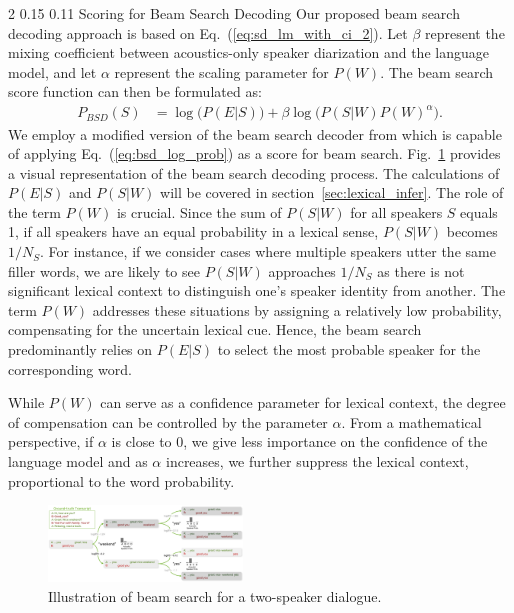 \documentclass{article}
\makeatletter
\renewcommand{\subsection}{\@startsection
  {subsection}%
  {2}%
  {}%
  {0.15\baselineskip}%
  {0.11\baselineskip}%
  {}}%
\makeatother
\begin{document}
\subsection{Scoring for Beam Search Decoding}
Our proposed beam search decoding approach is based on Eq.~(\ref{eq:sd_lm_with_ci_2}). Let $\beta$ represent the mixing coefficient between acoustics-only speaker diarization and the language model, and let $\alpha$ represent the scaling parameter for $P(W)$. The beam search score function can then be formulated as:
\begin{align}
P_{BSD}(S) &= \log \bigl( P(E|S)\bigr) + \beta \log \bigl(P(S|W)P(W)^\alpha \bigr). 
\label{eq:bsd_log_prob}
\end{align}
We employ a modified version of the beam search decoder from \cite{pyctcdecode} which is capable of applying Eq.~(\ref{eq:bsd_log_prob}) as a score for beam search.  Fig.~\ref{fig:bsd_example} provides a visual representation of the beam search decoding process. The calculations of $P(E|S)$ and $P(S|W)$ will be covered in section~\ref{sec:lexical_infer}. The role of the term $P(W)$ is crucial. Since the sum of $P(S|W)$ for all speakers $S$ equals 1, if all speakers have an equal probability in a lexical sense, $P(S|W)$ becomes $1/N_{S}$. For instance, if we consider cases where multiple speakers utter the same filler words, we are likely to see $P(S|W)$ approaches $1/N_{S}$ as there is not significant lexical context to distinguish one's speaker identity from another. The term $P(W)$ addresses these situations by assigning a relatively low probability, compensating for the uncertain lexical cue. Hence, the beam search predominantly relies on $P(E|S)$ to select the most probable speaker for the corresponding word. 

While $P(W)$ can serve as a confidence parameter for lexical context, the degree of compensation can be controlled by the parameter $\alpha$. From a mathematical perspective, if $\alpha$ is close to 0, we give less importance on the confidence of the language model and as $\alpha$ increases, we further suppress the lexical context, proportional to the word probability.

\begin{figure}[t]
\centering
\includegraphics[width=0.46\textwidth]{pics/bsd_example.png}
\caption{Illustration of beam search for a two-speaker dialogue.}
\label{fig:bsd_example}
\vspace{-5px}
\end{figure}
\end{document}

